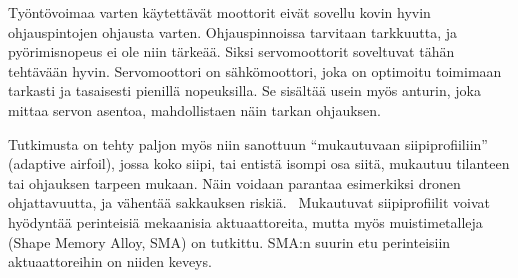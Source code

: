 Työntövoimaa varten käytettävät moottorit eivät sovellu kovin hyvin
ohjauspintojen ohjausta varten. Ohjauspinnoissa tarvitaan tarkkuutta, ja
pyörimisnopeus ei ole niin tärkeää. Siksi servomoottorit soveltuvat tähän
tehtävään hyvin. Servomoottori on sähkömoottori, joka on optimoitu toimimaan
tarkasti ja tasaisesti pienillä nopeuksilla. Se sisältää usein myös anturin,
joka mittaa servon asentoa, mahdollistaen näin tarkan ohjauksen.~\cite{Suh2008}

Tutkimusta on tehty paljon myös niin sanottuun ``mukautuvaan siipiprofiiliin''
(adaptive airfoil), jossa koko siipi, tai entistä isompi osa siitä, mukautuu
tilanteen tai ohjauksen tarpeen mukaan. Näin voidaan parantaa esimerkiksi
dronen ohjattavuutta, ja vähentää sakkauksen riskiä.~\cite{Huang2013}
Mukautuvat siipiprofiilit voivat hyödyntää perinteisiä mekaanisia
aktuaattoreita, mutta myös muistimetalleja (Shape Memory Alloy, SMA) on
tutkittu. SMA:n suurin etu perinteisiin aktuaattoreihin on niiden
keveys.~\cite{Abdullah2010}
